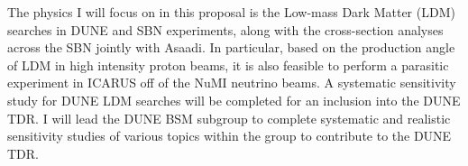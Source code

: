 The physics I will focus on in this proposal is the Low-mass Dark Matter (LDM) searches in DUNE and SBN experiments, along with the cross-section analyses across the SBN jointly with Asaadi.  In particular, based on the production angle of LDM in high intensity proton beams, it is also feasible to perform a parasitic experiment in ICARUS off of the NuMI neutrino beams.   A systematic sensitivity study for DUNE LDM searches will be completed for an inclusion into the DUNE TDR.  I will lead the DUNE BSM subgroup to complete systematic and realistic sensitivity studies of various topics within the group to contribute to the DUNE TDR.



